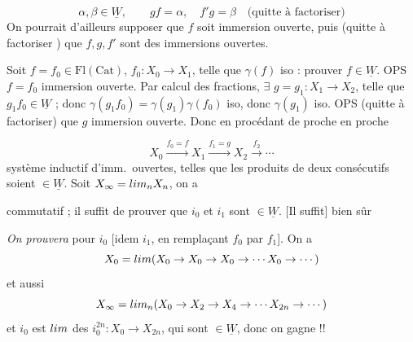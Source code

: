 \documentclass[11pt,a4paper]{article}
\begin{document}

\[
  \alpha, \beta \in \underline{W}, \qquad gf = \alpha, \quad f'g = \beta
  \quad \text{(quitte à factoriser)}
\]
On pourrait d'ailleurs supposer que $f$ soit immersion ouverte, puis
(quitte à factoriser  \ill{}) que $f, g, f'$ sont
des immersions ouvertes.




Soit $f = f_0 \in \mathrm{Fl}(\mathrm{Cat})$, $f_0 : X_0 \to X_1$, telle que $\gamma(f)$ iso : prouver $f \in \underline{W}$. OPS $f =
f_0$ immersion ouverte. Par calcul des fractions, $\exists$ $g = g_1 :
X_1 \to X_2$, telle que $g_1 f_0 \in \underline{W}$ ; donc $\gamma(g_1
f_0) = \gamma(g_1)\gamma(f_0)$ iso, donc $\gamma(g_1)$ iso. OPS (quitte à
factoriser) que $g$ immersion ouverte. Donc en procédant de proche en
proche

\[
  X_0 \xrightarrow{f_0 = f} X_1 \xrightarrow{f_1 = g} X_2
  \xrightarrow{f_2} \cdots
\]
 système inductif d'imm.\ ouvertes, telles que les produits
de deux consécutifs soient $\in \underline{W}$. Soit $X_\infty =
\varinjlim_n X_n$, on a


commutatif ; il suffit de prouver que $i_0$ et $i_1$ sont $\in
\underline{W}$. [Il suffit] bien sûr \ill{} \struck{\ill{}}

 \emph{On prouvera} pour $i_0$ [idem $i_1$, en
remplaçant $f_0$ par $f_1$]. On a
\[
  X_0 = \varinjlim (X_0 \to X_0 \to X_0 \to \cdots X_0 \to \cdots)
\]
et aussi
\[
  X_\infty = \varinjlim_n (X_0 \to X_2 \to X_4 \to \cdots X_{2n} \to
  \cdots)
\]
et $i_0$ est $\varinjlim$ des $i_0^{2n} : X_0 \to X_{2n}$, qui sont
$\in \underline{W}$, donc on gagne !!
\end{document}

